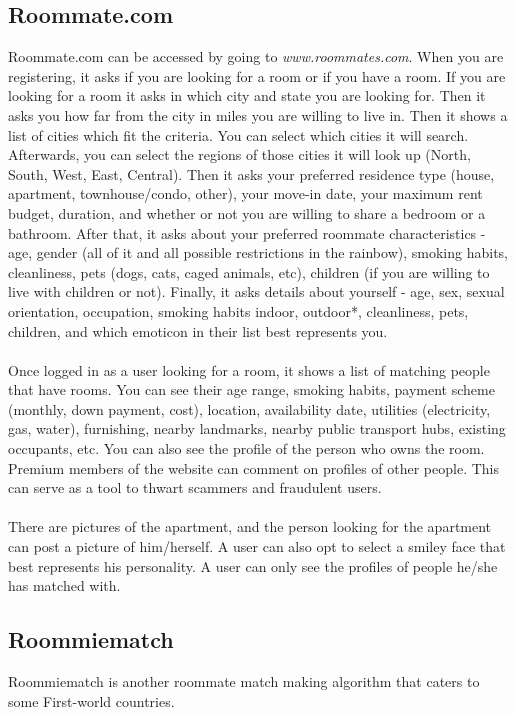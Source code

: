 \documentclass[journal]{./IEEE/IEEEtran}
\begin{document}
\subsection{Roommate.com}
Roommate.com can be accessed by going to \textit{www.roommates.com}. When you are registering, it asks if you are looking for a room or if you have a room. If you are looking for a room it asks in which city and state you are looking for. Then it asks you how far from the city in miles you are willing to live in. Then it shows a list of cities which fit the criteria. You can select which cities it will search. Afterwards, you can select the regions of those cities it will look up (North, South, West, East, Central). Then it asks your preferred residence type (house, apartment, townhouse/condo, other), your move-in date, your maximum rent budget, duration, and whether or not you are willing to share a bedroom or a bathroom. After that, it asks about your preferred roommate characteristics - age, gender (all of it and all possible restrictions in the rainbow), smoking habits, cleanliness, pets (dogs, cats, caged animals, etc), children (if you are willing to live with children or not). Finally, it asks details about yourself -  age, sex, sexual orientation, occupation, smoking habits {indoor, outdoor}*, cleanliness, pets, children, and which emoticon in their list best represents you.
\\
\\
\indent Once logged in as a user looking for a room, it shows a list of matching people that have rooms. You can see their age range, smoking habits, payment scheme (monthly, down payment, cost), location, availability date, utilities (electricity, gas, water), furnishing, nearby landmarks, nearby public transport hubs, existing occupants, etc. You can also see the profile of the person who owns the room. Premium members of the website can comment on profiles of other people. This can serve as a tool to thwart scammers and fraudulent users.
\\
\\
\indent There are pictures of the apartment, and the person looking for the apartment can post a picture of him/herself. A user can also opt to select a smiley face that best represents his personality. A user can only see the profiles of people he/she has matched with.
\subsection{Roommiematch}
Roommiematch is another roommate match making algorithm that caters to some First-world countries.
\end{document}
